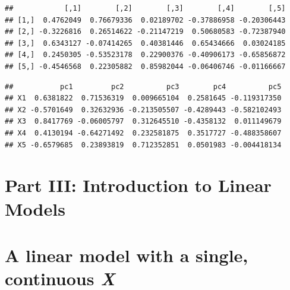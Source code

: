 \documentclass[]{book}
\newenvironment{Shaded}{\begin{snugshade}}{\end{snugshade}}
\newcommand{\KeywordTok}[1]{\textcolor[rgb]{0.13,0.29,0.53}{\textbf{#1}}}
\newcommand{\DecValTok}[1]{\textcolor[rgb]{0.00,0.00,0.81}{#1}}
\newcommand{\StringTok}[1]{\textcolor[rgb]{0.31,0.60,0.02}{#1}}
\newcommand{\OperatorTok}[1]{\textcolor[rgb]{0.81,0.36,0.00}{\textbf{#1}}}
\newcommand{\NormalTok}[1]{#1}
\begin{document}
\begin{verbatim}
##            [,1]        [,2]        [,3]        [,4]        [,5]
## [1,]  0.4762049  0.76679336  0.02189702 -0.37886958 -0.20306443
## [2,] -0.3226816  0.26514622 -0.21147219  0.50680583 -0.72387940
## [3,]  0.6343127 -0.07414265  0.40381446  0.65434666  0.03024185
## [4,]  0.2450305 -0.53523178  0.22900376 -0.40906173 -0.65856872
## [5,] -0.4546568  0.22305882  0.85982044 -0.06406746 -0.01166667
\end{verbatim}

\begin{Shaded}
\end{Shaded}

\begin{verbatim}
##           pc1         pc2          pc3        pc4          pc5
## X1  0.6381822  0.71536319  0.009665104  0.2581645 -0.119317350
## X2 -0.5701649  0.32632936 -0.213505507 -0.4289443 -0.582102493
## X3  0.8417769 -0.06005797  0.312645510 -0.4358132  0.011149679
## X4  0.4130194 -0.64271492  0.232581875  0.3517727 -0.488358607
## X5 -0.6579685  0.23893819  0.712352851  0.0501983 -0.004418134
\end{verbatim}

\chapter*{Part III: Introduction to Linear
Models}\label{part-iii-introduction-to-linear-models}

\chapter{\texorpdfstring{A linear model with a single, continuous
\emph{X}}{A linear model with a single, continuous X}}\label{a-linear-model-with-a-single-continuous-x}
\end{document}

